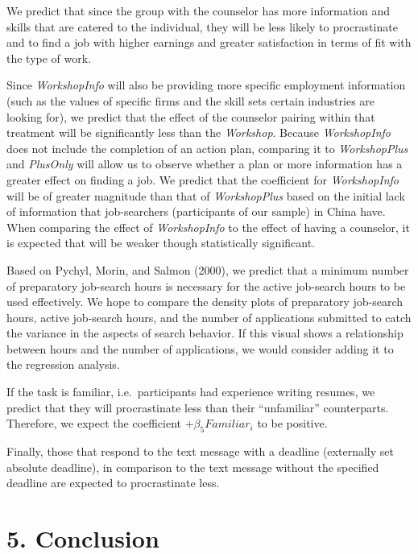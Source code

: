 \documentclass[]{elsarticle} %
\begin{document}
We predict that since the group with the counselor has more information
and skills that are catered to the individual, they will be less likely
to procrastinate and to find a job with higher earnings and greater
satisfaction in terms of fit with the type of work.

Since \emph{WorkshopInfo} will also be providing more specific
employment information (such as the values of specific firms and the
skill sets certain industries are looking for), we predict that the
effect of the counselor pairing within that treatment will be
significantly less than the \emph{Workshop}. Because \emph{WorkshopInfo}
does not include the completion of an action plan, comparing it to
\emph{WorkshopPlus} and \emph{PlusOnly} will allow us to observe whether
a plan or more information has a greater effect on finding a job. We
predict that the coefficient for \emph{WorkshopInfo} will be of greater
magnitude than that of \emph{WorkshopPlus} based on the initial lack of
information that job-searchers (participants of our sample) in China
have. When comparing the effect of \emph{WorkshopInfo} to the effect of
having a counselor, it is expected that will be weaker though
statistically significant.

Based on Pychyl, Morin, and Salmon (2000), we predict that a minimum
number of preparatory job-search hours is necessary for the active
job-search hours to be used effectively. We hope to compare the density
plots of preparatory job-search hours, active job-search hours, and the
number of applications submitted to catch the variance in the aspects of
search behavior. If this visual shows a relationship between hours and
the number of applications, we would consider adding it to the
regression analysis.

If the task is familiar, i.e.~participants had experience writing
resumes, we predict that they will procrastinate less than their
``unfamiliar'' counterparts. Therefore, we expect the coefficient
\(+\beta_5 Familiar_i\) to be positive.

Finally, those that respond to the text message with a deadline
(externally set absolute deadline), in comparison to the text message
without the specified deadline are expected to procrastinate less.

\section{5. Conclusion}\label{conclusion}
\end{document}
